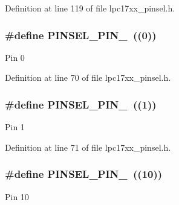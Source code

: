 Definition at line 119 of file lpc17xx\+\_\+pinsel.\+h.

\subsubsection[{\texorpdfstring{P\+I\+N\+S\+E\+L\+\_\+\+P\+I\+N\+\_\+0}{PINSEL_PIN_0}}]{\setlength{\rightskip}{0pt plus 5cm}\#define P\+I\+N\+S\+E\+L\+\_\+\+P\+I\+N\+\_~((0))}\hypertarget{group___p_i_n_s_e_l___public___macros_ga4cfdfb0d67ab68ce0c9b942b451a072b}{}\label{group___p_i_n_s_e_l___public___macros_ga4cfdfb0d67ab68ce0c9b942b451a072b}
Pin 0 

Definition at line 70 of file lpc17xx\+\_\+pinsel.\+h.

\subsubsection[{\texorpdfstring{P\+I\+N\+S\+E\+L\+\_\+\+P\+I\+N\+\_\+1}{PINSEL_PIN_1}}]{\setlength{\rightskip}{0pt plus 5cm}\#define P\+I\+N\+S\+E\+L\+\_\+\+P\+I\+N\+\_~((1))}\hypertarget{group___p_i_n_s_e_l___public___macros_gaab8dd29478207b88054c7069d7cbdddf}{}\label{group___p_i_n_s_e_l___public___macros_gaab8dd29478207b88054c7069d7cbdddf}
Pin 1 

Definition at line 71 of file lpc17xx\+\_\+pinsel.\+h.

\subsubsection[{\texorpdfstring{P\+I\+N\+S\+E\+L\+\_\+\+P\+I\+N\+\_\+10}{PINSEL_PIN_10}}]{\setlength{\rightskip}{0pt plus 5cm}\#define P\+I\+N\+S\+E\+L\+\_\+\+P\+I\+N\+\_~((10))}\hypertarget{group___p_i_n_s_e_l___public___macros_ga26ae3a32a8ac30b72df02438baadfdce}{}\label{group___p_i_n_s_e_l___public___macros_ga26ae3a32a8ac30b72df02438baadfdce}
Pin 10 

